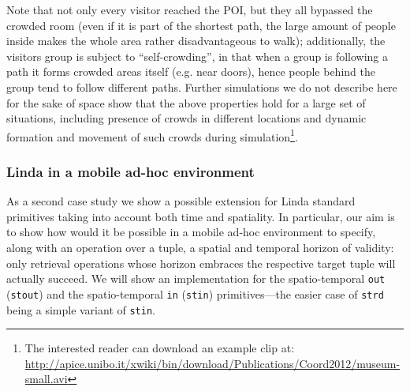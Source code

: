 \documentclass[12pt,a4paper,twoside,openright]{book}
\begin{document}
%
Note that not only every visitor reached the POI, but they all bypassed the crowded room (even if it is part of the shortest path, the large amount of people inside makes the whole area rather disadvantageous to walk); additionally, the visitors group is subject to ``self-crowding'', in that when a group is following a path it  forms crowded areas itself (e.g. near doors), hence people behind the group tend to follow different paths.
%
Further simulations we do not describe here for the sake of space show that the above properties hold for a large set of situations, including presence of crowds in different locations and dynamic formation and movement of such crowds during simulation\footnote{The interested reader can download an example clip at: {\url{http://apice.unibo.it/xwiki/bin/download/Publications/Coord2012/museum-small.avi}}}.

\subsubsection{Linda in a mobile ad-hoc environment}

As a second case study we show a possible extension for Linda standard primitives taking into account both time and spatiality.
%
In particular, our aim is to show how would it be possible in a mobile ad-hoc environment to specify, along with an operation over a tuple, a spatial and temporal horizon of validity: only retrieval operations whose horizon embraces the respective target tuple will actually succeed.
%
We will show an implementation for the spatio-temporal \texttt{out} (\texttt{stout}) and the spatio-temporal \texttt{in} (\texttt{stin}) primitives---the easier case of \texttt{strd} being a simple variant of \texttt{stin}.
\end{document}
